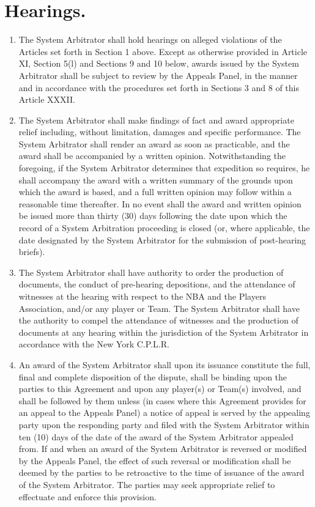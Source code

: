 \documentclass[
]{book}
\providecommand{\tightlist}{%
  \setlength{\itemsep}{0pt}\setlength{\parskip}{0pt}}
\begin{document}
\hypertarget{hearings.-1}{%
\section{Hearings.}\label{hearings.-1}}

\begin{enumerate}
\def\labelenumi{(\alph{enumi})}
\tightlist
\item
  The System Arbitrator shall hold hearings on alleged violations of the Articles set forth in Section 1 above. Except as otherwise provided in Article XI, Section 5(l) and Sections 9 and 10 below, awards issued by the System Arbitrator shall be subject to review by the Appeals Panel, in the manner and in accordance with the procedures set forth in Sections 3 and 8 of this Article XXXII.
\item
  The System Arbitrator shall make findings of fact and award appropriate relief including, without limitation, damages and specific performance. The System Arbitrator shall render an award as soon as practicable, and the award shall be accompanied by a written opinion. Notwithstanding the foregoing, if the System Arbitrator determines that expedition so requires, he shall accompany the award with a written summary of the grounds upon which the award is based, and a full written opinion may follow within a reasonable time thereafter. In no event shall the award and written opinion be issued more than thirty (30) days following the date upon which the record of a System Arbitration proceeding is closed (or, where applicable, the date designated by the System Arbitrator for the submission of post-hearing briefs).
\item
  The System Arbitrator shall have authority to order the production of documents, the conduct of pre-hearing depositions, and the attendance of witnesses at the hearing with respect to the NBA and the Players Association, and/or any player or Team. The System Arbitrator shall have the authority to compel the attendance of witnesses and the production of documents at any hearing within the jurisdiction of the System Arbitrator in accordance with the New York C.P.L.R.
\item
  An award of the System Arbitrator shall upon its issuance constitute the full, final and complete disposition of the dispute, shall be binding upon the parties to this Agreement and upon any player(s) or Team(s) involved, and shall be followed by them unless (in cases where this Agreement provides for an appeal to the Appeals Panel) a notice of appeal is served by the appealing party upon the responding party and filed with the System Arbitrator within ten (10) days of the date of the award of the System Arbitrator appealed from. If and when an award of the System Arbitrator is reversed or modified by the Appeals Panel, the effect of such reversal or modification shall be deemed by the parties to be retroactive to the time of issuance of the award of the System Arbitrator. The parties may seek appropriate relief to effectuate and enforce this provision.

\end{enumerate}
\end{document}
